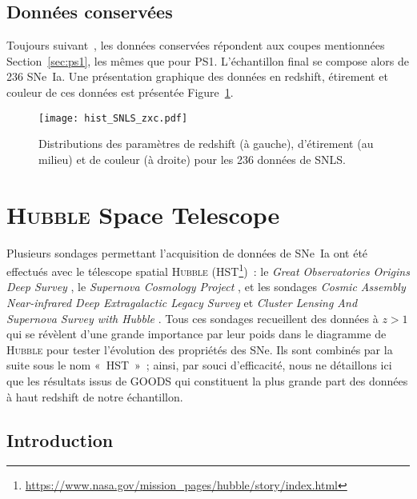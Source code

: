\documentclass[../main/main.tex]{subfiles}
\begin{document}
\subsection{Données conservées}\label{sec:snlsdata}

Toujours suivant~\cite{scolnic2018}, les données conservées répondent aux coupes
mentionnées Section~\ref{sec:ps1}, les mêmes que pour PS1. L'échantillon final
se compose alors de 236 SNe~Ia. Une présentation graphique des données en
redshift, étirement et couleur de ces données est présentée
Figure~\ref{fig:snlshist}.

\begin{figure}[ht]
    \centering
    \texttt{[image: hist\_SNLS\_zxc.pdf]}
    \caption[Distributions des paramètres de redshift, étirement et couleur de
    SNLS]{Distributions des paramètres de redshift (à gauche), d'étirement (au
    milieu) et de couleur (à droite) pour les 236 données de SNLS.}
    \label{fig:snlshist}
\end{figure}

\section{\textsc{Hubble} Space Telescope}\label{sec:hst}

Plusieurs sondages permettant l'acquisition de données de SNe~Ia ont été
effectués avec le télescope spatial \textsc{Hubble}
(HST\footnote{\href{https://www.nasa.gov/mission_pages/hubble/story/index.html}
{https://www.nasa.gov/mission\_pages/hubble/story/index.html}})~: le
\textit{Great Observatories Origins Deep
Survey} \citep[GOODS,][]{giavalisco2004, strolger2004, riess2007}, le
\textit{Supernova Cosmology Project} \citep[SCP,][]{suzuki2012}, et les sondages
\textit{Cosmic Assembly Near-infrared Deep Extragalactic Legacy
Survey} \citep[CANDELS,][]{rodney2014} et \textit{Cluster Lensing And Supernova
Survey with Hubble} \citep[CLASH,][]{graur2014}. Tous ces sondages recueillent
des données à $z > 1$ qui se révèlent d'une grande importance par leur poids
dans le diagramme de \textsc{Hubble} pour tester l'évolution des propriétés des
SNe. Ils sont combinés par la suite sous le nom «~HST~»~; ainsi, par souci
d'efficacité, nous ne détaillons ici que les résultats issus de GOODS qui
constituent la plus grande part des données à haut redshift de notre
échantillon.

\subsection{Introduction}\label{ssec:hstintro}
\end{document}
